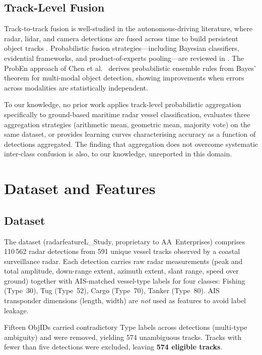 \documentclass[10pt,journal,compsoc]{IEEEtran}
\begin{document}
\subsection{Track-Level Fusion}

Track-to-track fusion is well-studied in the autonomous-driving literature,
where radar, lidar, and camera detections are fused across time to build
persistent object tracks \cite{garcia_fusion_2016}.  Probabilistic fusion
strategies---including Bayesian classifiers, evidential frameworks, and
product-of-experts pooling---are reviewed in \cite{survey_data_fusion_2020}.
The ProbEn approach of Chen et al.\ \cite{proben_2022} derives probabilistic
ensemble rules from Bayes' theorem for multi-modal object detection, showing
improvements when errors across modalities are statistically independent.

To our knowledge, no prior work applies track-level probabilistic aggregation
specifically to ground-based maritime radar vessel classification, evaluates
three aggregation strategies (arithmetic mean, geometric mean, majority vote)
on the same dataset, or provides learning curves characterising accuracy as a
function of detections aggregated.  The finding that aggregation does not
overcome systematic inter-class confusion is also, to our knowledge,
unreported in this domain.

\section{Dataset and Features}\label{sec:data}

\subsection{Dataset}

The dataset (radarfeatureL\_Study, proprietary to AA~Enterprises) comprises
110\,562 radar detections from 591 unique vessel tracks observed by a
coastal surveillance radar.  Each detection carries raw radar measurements
(peak and total amplitude, down-range extent, azimuth extent, slant range,
speed over ground) together with AIS-matched vessel-type labels for four
classes: Fishing (Type~30), Tug (Type~52), Cargo (Type~70), Tanker (Type~80).
AIS transponder dimensions (length, width) are \emph{not} used as features
to avoid label leakage.

Fifteen ObjIDs carried contradictory Type labels across detections (multi-type
ambiguity) and were removed, yielding 574 unambiguous tracks.  Tracks with
fewer than five detections were excluded, leaving \textbf{574 eligible tracks}.
\end{document}

